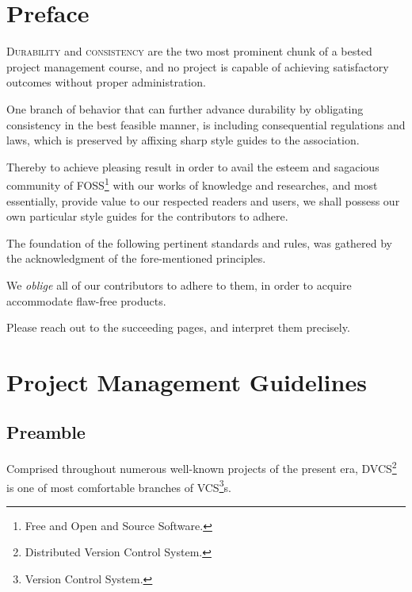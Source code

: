 \documentclass[13pt]{scrarticle}
\newcommand{\header}[1]{ \textsf{#1} \relax{}}
\newcommand{\important}[1]{\textit{#1}}
\newcommand{\name}[1]{{\textsc{#1}}}
\begin{document}
    \newpage
    \section{\header{Preface}}


    \name{Durability } and \name{consistency } are the two most prominent chunk of a bested project management course,
    and no project is capable of achieving satisfactory outcomes without proper administration. \newline

    One branch of behavior that can further advance durability by obligating consistency in the best feasible manner,
    is including consequential regulations and laws,
    which is preserved by affixing sharp style guides to the association. \newline

    Thereby to achieve pleasing result in order to avail the esteem and sagacious community of \name{FOSS}\footnote{Free and Open and Source Software.} with our works of knowledge and researches,
    and most essentially, provide value to our respected readers and users,
    we shall possess our own particular style guides for the contributors to adhere. \newline

    The foundation of the following pertinent standards and rules, was gathered by the acknowledgment of the fore-mentioned
    principles. \newline

    We \important{oblige} all of our contributors to adhere to them,
    in order to acquire accommodate flaw-free products. \newline

    Please reach out to the succeeding pages,
    and interpret them precisely.


    \newpage
    \thispagestyle{fancy}

    \section{\header{Project Management Guidelines}}
    \subsection{Preamble}

    Comprised throughout numerous well-known projects of the present era,
    \name{DVCS}\footnote{Distributed Version Control System.} is one of most comfortable branches of \name{VCS}\footnote{Version Control System.}s. \newline
\end{document}
